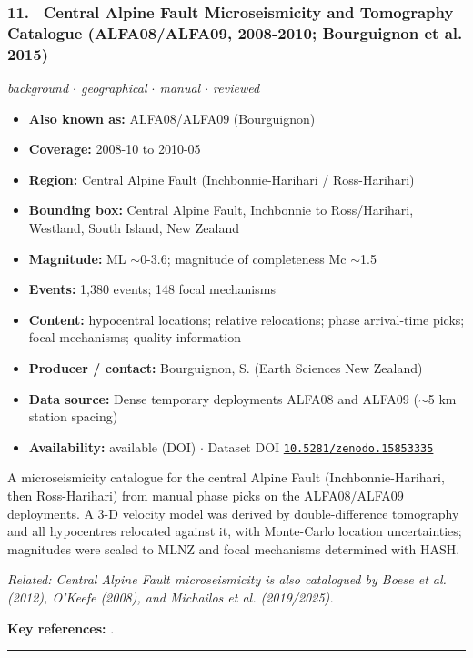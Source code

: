 \documentclass[10pt,a4paper]{article}
\newcommand{\catentryrule}{\par\vspace{3pt}\noindent\textcolor{rulegrey}{\rule{\linewidth}{0.3pt}}\par\vspace{5pt}}
\newcommand{\kv}[2]{\item \textbf{#1:} #2}
\begin{document}
\subsubsection*{\hypertarget{c:11}{11.}~ Central Alpine Fault Microseismicity and Tomography Catalogue (ALFA08/ALFA09, 2008-2010; Bourguignon et al. 2015)}
{\small\itshape background $\cdot$ geographical $\cdot$ manual $\cdot$ reviewed}\par\vspace{2pt}
\begin{itemize}[leftmargin=1.3em,itemsep=0.6pt,topsep=1pt,parsep=0pt]
\kv{Also known as}{ALFA08/ALFA09 (Bourguignon)}
\kv{Coverage}{2008-10 to 2010-05}
\kv{Region}{Central Alpine Fault (Inchbonnie-Harihari / Ross-Harihari)}
\kv{Bounding box}{Central Alpine Fault, Inchbonnie to Ross/Harihari, Westland, South Island, New Zealand}
\kv{Magnitude}{ML $\sim$0-3.6; magnitude of completeness Mc $\sim$1.5}
\kv{Events}{1,380 events; 148 focal mechanisms}
\kv{Content}{hypocentral locations; relative relocations; phase arrival-time picks; focal mechanisms; quality information}
\kv{Producer / contact}{Bourguignon, S. (Earth Sciences New Zealand)}
\kv{Data source}{Dense temporary deployments ALFA08 and ALFA09 ($\sim$5 km station spacing)}
\kv{Availability}{available (DOI) $\cdot$ Dataset DOI \href{https://doi.org/10.5281/zenodo.15853335}{\nolinkurl{10.5281/zenodo.15853335}}}
\end{itemize}
\par\vspace{2pt}A microseismicity catalogue for the central Alpine Fault (Inchbonnie-Harihari, then Ross-Harihari) from manual phase picks on the ALFA08/ALFA09 deployments. A 3-D velocity model was derived by double-difference tomography and all hypocentres relocated against it, with Monte-Carlo location uncertainties; magnitudes were scaled to MLNZ and focal mechanisms determined with HASH.
\par{\small\itshape Related: Central Alpine Fault microseismicity is also catalogued by Boese et al. (2012), O'Keefe (2008), and Michailos et al. (2019/2025).}
\par\vspace{2pt}\textbf{Key references:} \cite{Bourguignon2015}.
\catentryrule
\end{document}

